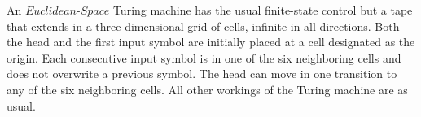 \documentclass[addpoints,a4paper]{exam}
\begin{document}
\begin{questions}
  
  \newpage
  \question [10] An $\textit{Euclidean-Space}$ Turing machine has the usual finite-state control but a tape that extends in a three-dimensional grid of cells, infinite in all directions. Both the head and the first input symbol are initially placed at a cell designated as the origin. Each consecutive input symbol is in one of the six neighboring cells and does not overwrite a previous symbol. The head can move in one transition to any of the six neighboring cells. All other workings of the Turing machine are as usual.
  

\end{questions}
\end{document}
